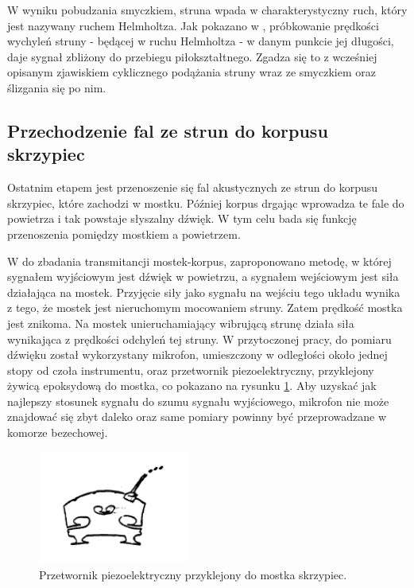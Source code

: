 W wyniku pobudzania smyczkiem, struna wpada w charakterystyczny ruch, który jest nazywany ruchem Helmholtza. Jak pokazano w \cite{bowed_2}, próbkowanie prędkości wychyleń struny - będącej w ruchu Helmholtza - w danym punkcie jej długości, daje sygnał zbliżony do przebiegu piłokształtnego. Zgadza się to z wcześniej opisanym zjawiskiem cyklicznego podążania struny wraz ze smyczkiem oraz ślizgania się po nim.

\subsection{Przechodzenie fal ze strun do korpusu skrzypiec} 

Ostatnim etapem jest przenoszenie się fal akustycznych ze strun do korpusu skrzypiec, które zachodzi w mostku. Później korpus drgając wprowadza te fale do powietrza i tak powstaje słyszalny dźwięk. W tym celu bada się funkcję przenoszenia pomiędzy mostkiem a powietrzem. 

W \cite{bowed_smith} do zbadania transmitancji mostek-korpus, zaproponowano metodę, w której sygnałem wyjściowym jest dźwięk w powietrzu, a sygnałem wejściowym jest siła działająca na mostek. Przyjęcie siły jako sygnału na wejściu tego układu wynika z tego, że mostek jest nieruchomym mocowaniem struny. Zatem prędkość mostka jest znikoma. Na mostek unieruchamiający wibrującą strunę działa siła wynikająca z prędkości odchyleń tej struny. W przytoczonej pracy, do pomiaru dźwięku został wykorzystany mikrofon, umieszczony w odległości około jednej stopy od czoła instrumentu, oraz przetwornik piezoelektryczny, przyklejony żywicą epoksydową do mostka, co pokazano na rysunku \ref{rys:pomiary}. Aby uzyskać jak najlepszy stosunek sygnału do szumu sygnału wyjściowego, mikrofon nie może znajdować się zbyt daleko oraz same pomiary powinny być przeprowadzane w komorze bezechowej.

\begin{figure}[H]
	\centering
	\includegraphics[width=5cm]{grafiki/pomiary}
	\captionsetup{justification=centering}
	\caption{Przetwornik piezoelektryczny przyklejony do mostka skrzypiec.}
	\label{rys:pomiary}
\end{figure}

